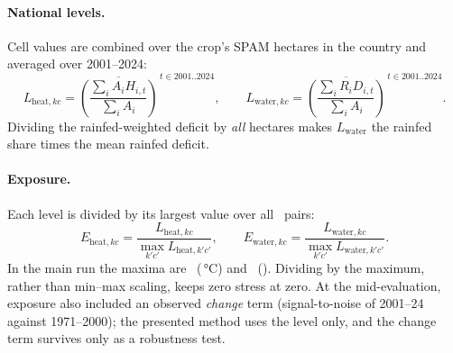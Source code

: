 \paragraph{National levels.} Cell values are combined over the crop's SPAM hectares in the country and averaged
over 2001--2024:
\begin{equation}\label{eq:levels}
L_{\text{heat},kc} = \overline{\left(\frac{\sum_i A_i H_{i,t}}{\sum_i A_i}\right)}^{\,t\in 2001..2024},\qquad
L_{\text{water},kc} = \overline{\left(\frac{\sum_i R_i D_{i,t}}{\sum_i A_i}\right)}^{\,t\in 2001..2024}.
\end{equation}
Dividing the rainfed-weighted deficit by \emph{all} hectares makes $L_{\text{water}}$ the rainfed share times
the mean rainfed deficit.

\paragraph{Exposure.} Each level is divided by its largest value over all \nPairs\ pairs:
\begin{equation}\label{eq:exposure}
E_{\text{heat},kc} = \frac{L_{\text{heat},kc}}{\max_{k'c'} L_{\text{heat},k'c'}},\qquad
E_{\text{water},kc} = \frac{L_{\text{water},kc}}{\max_{k'c'} L_{\text{water},k'c'}}.
\end{equation}
In the main run the maxima are \ (\,\si{\celsius}) and \ (). Dividing by
the maximum, rather than min--max scaling, keeps zero stress at zero. At the mid-evaluation, exposure also included
an observed \emph{change} term (signal-to-noise of 2001--24 against 1971--2000); the presented method uses the level
only, and the change term survives only as a robustness test.

